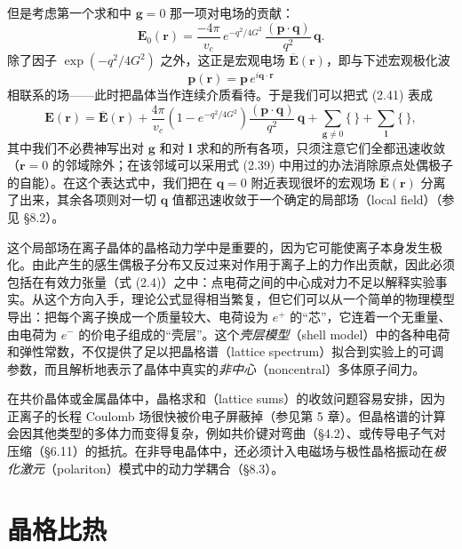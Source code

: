 但是考虑第一个求和中 $\boldsymbol{g}=0$ 那一项对电场的贡献：
\begin{equation*}
\mathbf{E}_0(\mathbf{r}) = \frac{-4\pi}{v_c}\, e^{-q^2/4G^2}\,\frac{(\mathbf{p}\cdot\mathbf{q})}{q^2}\,\mathbf{q}.
\tag{2.43}
\end{equation*}
除了因子 $\exp(-q^2/4G^2)$ 之外，这正是宏观电场 $\overline{\mathbf{E}}(\mathbf{r})$，即与下述宏观极化波
\begin{equation*}
\mathbf{p}(\mathbf{r}) = \mathbf{p}\, e^{i\mathbf{q}\cdot\mathbf{r}}
\tag{2.44}
\end{equation*}
相联系的场——此时把晶体当作连续介质看待。于是我们可以把式 (2.41) 表成
\begin{equation*}
\mathbf{E}(\mathbf{r}) = \overline{\mathbf{E}}(\mathbf{r}) + \frac{4\pi}{v_c}\left(1-e^{-q^2/4G^2}\right)\frac{(\mathbf{p}\cdot\mathbf{q})}{q^2}\,\mathbf{q} + \sum_{\boldsymbol{g}\neq 0}\{\,\} + \sum_{\boldsymbol{l}}\{\,\},
\tag{2.45}
\end{equation*}
其中我们不必费神写出对 $\boldsymbol{g}$ 和对 $\boldsymbol{l}$ 求和的所有各项，只须注意它们全都迅速收敛（$\mathbf{r}=0$ 的邻域除外；在该邻域可以采用式 (2.39) 中用过的办法消除原点处偶极子的自能）。在这个表达式中，我们把在 $\mathbf{q}=0$ 附近表现很坏的宏观场 $\overline{\mathbf{E}}(\mathbf{r})$ 分离了出来，其余各项则对一切 $\mathbf{q}$ 值都迅速收敛于一个确定的局部场（local field）（参见 §8.2）。

这个局部场在离子晶体的晶格动力学中是重要的，因为它可能使离子本身发生极化。由此产生的感生偶极子分布又反过来对作用于离子上的力作出贡献，因此必须包括在有效力张量（式 (2.4)）之中：点电荷之间的中心成对力不足以解释实验事实。从这个方向入手，理论公式显得相当繁复，但它们可以从一个简单的物理模型导出：把每个离子换成一个质量较大、电荷设为 $e^+$ 的“芯”，它连着一个无重量、由电荷为 $e^-$ 的价电子组成的“壳层”。这个\emph{壳层模型}（shell model）中的各种电荷和弹性常数，不仅提供了足以把晶格谱（lattice spectrum）拟合到实验上的可调参数，而且解析地表示了晶体中真实的\emph{非中心}（noncentral）多体原子间力。

在共价晶体或金属晶体中，晶格求和（lattice sums）的收敛问题容易安排，因为正离子的长程 Coulomb 场很快被价电子屏蔽掉（参见第 5 章）。但晶格谱的计算会因其他类型的多体力而变得复杂，例如共价键对弯曲（§4.2）、或传导电子气对压缩（§6.11）的抵抗。在非导电晶体中，还必须计入电磁场与极性晶格振动在\emph{极化激元}（polariton）模式中的动力学耦合（§8.3）。

\section{晶格比热}

